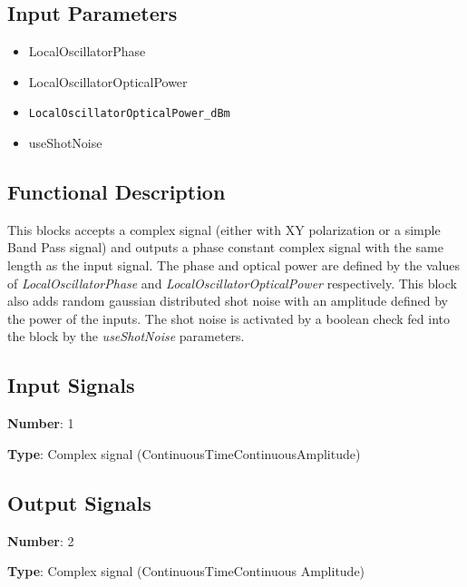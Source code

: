 \documentclass[../../sdf/tex/BPSK_system.tex]{subfiles}
\date{}
\begin{document}
\onlyinsubfile{\maketitle}

\subsection*{Input Parameters}

\begin{multicols}{2}
	\begin{itemize}
		\item LocalOscillatorPhase
		\item LocalOscillatorOpticalPower
		\item \verb|LocalOscillatorOpticalPower_dBm|
		\item useShotNoise
	\end{itemize}
\end{multicols}

\subsection*{Functional Description}

This blocks accepts a complex signal (either with XY polarization or a simple Band Pass signal) and outputs a phase constant complex signal with the same length as the input signal. The phase and optical power are defined by the values of \textit{LocalOscillatorPhase} and \textit{LocalOscillatorOpticalPower} respectively. This block also adds random gaussian distributed shot noise with an amplitude defined by the power of the inputs. The shot noise is activated by a boolean check fed into the block by the \textit{useShotNoise} parameters.

\subsection*{Input Signals}

\textbf{Number}: 1

\textbf{Type}: Complex signal (ContinuousTimeContinuousAmplitude)

\subsection*{Output Signals}

\textbf{Number}: 2

\textbf{Type}: Complex signal (ContinuousTimeContinuous Amplitude)
\end{document}
